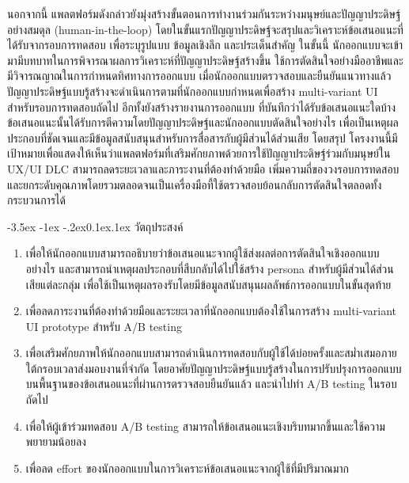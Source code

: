 \documentclass[a4paper,oneside]{cpe-thesis-th}
\makeatletter
\renewcommand\section{\@startsection{section}{1}{\z@}%
   {-3.5ex \@plus -1ex \@minus -.2ex}{0.1ex\@plus.1ex}%
   {\normalfont\thsz@section\bfseries}}
\newcommand{\thaijustify}[1]{%
  \par\hspace{30pt}\justifying
  #1
}
\makeatother
\begin{document}
\thaijustify{
  นอกจากนี้ แพลตฟอร์มดังกล่าวยังมุ่งสร้างขั้นตอนการทำงานร่วมกันระหว่างมนุษย์และปัญญาประดิษฐ์อย่างสมดุล (human-in-the-loop) โดยในขั้นแรกปัญญาประดิษฐ์จะสรุปและวิเคราะห์ข้อเสนอแนะที่ได้รับจากรอบการทดสอบ เพื่อระบุรูปแบบ ข้อมูลเชิงลึก และประเด็นสำคัญ ในขั้นนี้ นักออกแบบจะเข้ามามีบทบาทในการพิจารณาผลการวิเคราะห์ที่ปัญญาประดิษฐ์สร้างขึ้น ใช้การตัดสินใจอย่างมืออาชีพและมีวิจารณญาณในการกำหนดทิศทางการออกแบบ \cite{chung2025ureka} เมื่อนักออกแบบตรวจสอบและยืนยันแนวทางแล้ว ปัญญาประดิษฐ์แบบรู้สร้างจะดำเนินการตามที่นักออกแบบกำหนดเพื่อสร้าง multi-variant UI สำหรับรอบการทดสอบถัดไป อีกทั้งยังสร้างรายงานการออกแบบ ที่บันทึกว่าได้รับข้อเสนอแนะใดบ้าง ข้อเสนอแนะนั้นได้รับการตีความโดยปัญญาประดิษฐ์และนักออกแบบตัดสินใจอย่างไร เพื่อเป็นเหตุผลประกอบที่ชัดเจนและมีข้อมูลสนับสนุนสำหรับการสื่อสารกับผู้มีส่วนได้ส่วนเสีย โดยสรุป โครงงานนี้มีเป้าหมายเพื่อแสดงให้เห็นว่าแพลตฟอร์มที่เสริมศักยภาพด้วยการใช้ปัญญาประดิษฐ์ร่วมกับมนุษย์ใน UX/UI DLC สามารถลดระยะเวลาและภาระงานที่ต้องทำด้วยมือ เพิ่มความถี่ของวงรอบการทดสอบ และยกระดับคุณภาพโดยรวมตลอดจนเป็นเครื่องมือที้ใช้ตรวจสอบย้อนกลับการตัดสินใจตลอดทั้งกระบวนการได้}


\section{วัตถุประสงค์}
\thaijustify{
  \begin{enumerate}

    \item เพื่อให้นักออกแบบสามารถอธิบายว่าข้อเสนอแนะจากผู้ใช้ส่งผลต่อการตัดสินใจเชิงออกแบบอย่างไร และสามารถนำเหตุผลประกอบที่สืบกลับได้ไปใช้สร้าง persona สำหรับผู้มีส่วนได้ส่วนเสียแต่ละกลุ่ม เพื่อใช้เป็นเหตุผลรองรับโดยมีข้อมูลสนับสนุนผลลัพธ์การออกแบบในขั้นสุดท้าย

    \item เพื่อลดภาระงานที่ต้องทำด้วยมือและระยะเวลาที่นักออกแบบต้องใช้ในการสร้าง multi-variant UI prototype สำหรับ A/B testing

    \item เพื่อเสริมศักยภาพให้นักออกแบบสามารถดำเนินการทดสอบกับผู้ใช้ได้บ่อยครั้งและสม่ำเสมอภายใต้กรอบเวลาส่งมอบงานที่จำกัด โดยอาศัยปัญญาประดิษฐ์แบบรู้สร้างในการปรับปรุงการออกแบบบนพื้นฐานของข้อเสนอแนะที่ผ่านการตรวจสอบยืนยันแล้ว และนำไปทำ A/B testing ในรอบถัดไป

    \item เพื่อให้ผู้เข้าร่วมทดสอบ A/B testing สามารถให้ข้อเสนอแนะเชิงบริบทมากขึ้นและใช้ความพยายามน้อยลง

    \item เพื่อลด effort ของนักออกแบบในการวิเคราะห์ข้อเสนอแนะจากผู้ใช้ที่มีปริมาณมาก
\end{enumerate}
}
\end{document}

